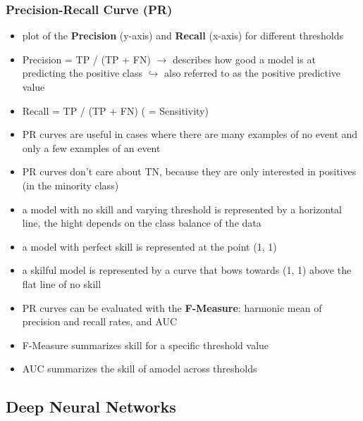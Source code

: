 \documentclass[12pt,a4paper]{article}
\begin{document}
\subsubsection{Precision-Recall Curve (PR)} %
\label{ssub:precision_recall_curve_}
\begin{itemize}
  \item plot of the \textbf{Precision} (y-axis) and \textbf{Recall} (x-axis) for different thresholds
  \item Precision = TP / (TP + FN)
  \newline \indent $\longrightarrow$ describes how good a model is at predicting the positive class
  \newline \indent $\hookrightarrow$ also referred to as the positive predictive value 
  \item Recall = TP / (TP + FN) ( = Sensitivity)
  \item PR curves are useful in cases where there are many examples of no event and only a few examples of an event
  \item PR curves don't care about TN, because they are only interested in positives (in the minority class)
  \item a model with no skill and varying threshold is represented by a horizontal line, the hight depends on the class balance of the data
  \item a model with perfect skill is represented at the point (1, 1)
  \item a skilful model is represented by a curve that bows towards (1, 1) above the flat line of no skill
  \item PR curves can be evaluated with the \textbf{F-Measure}: harmonic mean of precision and recall rates, and AUC
  \item F-Measure summarizes skill for a specific threshold value
  \item AUC summarizes the skill of amodel across thresholds
\end{itemize}



\subsection{Deep Neural Networks} %
\label{sub:deep_neural_networks}
\end{document}
